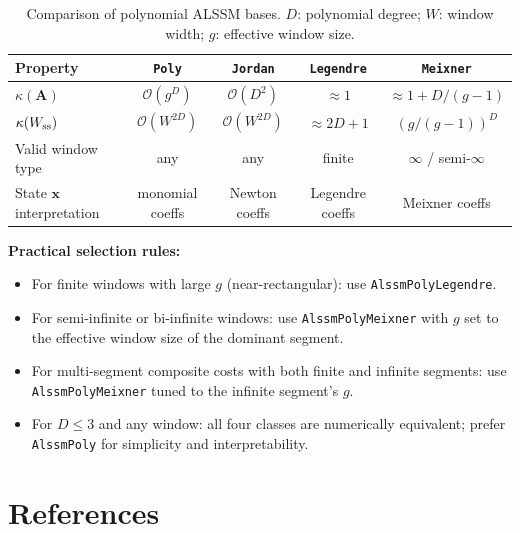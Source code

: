 \documentclass[11pt, a4paper]{article}
\theoremstyle{definition}
\newcommand{\vx}{\bm{x}}
\newcommand{\mA}{\bm{A}}
\begin{document}
\begin{table}[h]
\centering
\caption{Comparison of polynomial ALSSM bases. $D$: polynomial degree;
$W$: window width; $g$: effective window size.}
\label{tab:comparison}
\renewcommand{\arraystretch}{1.4}
\begin{tabular}{lcccc}
\toprule
Property & \texttt{Poly} & \texttt{Jordan} & \texttt{Legendre} & \texttt{Meixner} \\
\midrule
$\kappa(\mA)$                & $\mathcal{O}(g^D)$    & $\mathcal{O}(D^2)$    & $\approx 1$          & $\approx 1 + D/(g-1)$ \\
$\kappa(W_{\rm ss})$         & $\mathcal{O}(W^{2D})$ & $\mathcal{O}(W^{2D})$ & $\approx 2D+1$       & $(g/(g-1))^D$         \\
Valid window type            & any                   & any                   & finite               & $\infty$ / semi-$\infty$ \\            
State $\vx$ interpretation   & monomial coeffs       & Newton coeffs         & Legendre coeffs      & Meixner coeffs         \\
\bottomrule
\end{tabular}
\end{table}

\noindent\textbf{Practical selection rules:}
\begin{itemize}
  \item For finite windows with large $g$ (near-rectangular): use
    \texttt{AlssmPolyLegendre}.
  \item For semi-infinite or bi-infinite windows: use
    \texttt{AlssmPolyMeixner} with $g$ set to the effective window size of
    the dominant segment.
  \item For multi-segment composite costs with both finite and infinite
    segments: use \texttt{AlssmPolyMeixner} tuned to the infinite segment's $g$.
  \item For $D \leq 3$ and any window: all four classes are numerically
    equivalent; prefer \texttt{AlssmPoly} for simplicity and interpretability.
\end{itemize}

\section*{References}
\end{document}
